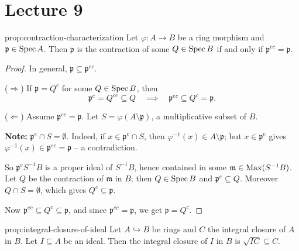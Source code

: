\section{Lecture 9}

\begin{proposition}{}{prop:contraction-characterization}
Let $\varphi: A \to B$ be a ring morphism and $\mathfrak p \in \operatorname{Spec} A$. Then $\mathfrak p$ is the contraction of some $Q \in \operatorname{Spec} B$ if and only if $\mathfrak p^{ec} = \mathfrak p$.
\end{proposition}

\begin{proof}
In general, $\mathfrak p \subseteq \mathfrak p^{ec}$.

($\Rightarrow$) If $\mathfrak p = Q^c$ for some $Q \in \operatorname{Spec} B$, then
\[
\mathfrak p^e = Q^{ce} \subseteq Q \quad\implies\quad \mathfrak p^{ec} \subseteq Q^c = \mathfrak p.
\]

($\Leftarrow$) Assume $\mathfrak p^{ec} = \mathfrak p$. Let $S = \varphi(A \setminus \mathfrak p)$, a multiplicative subset of $B$.

\textbf{Note:} $\mathfrak p^e \cap S = \emptyset$. Indeed, if $x \in \mathfrak p^e \cap S$, then $\varphi^{-1}(x) \in A\setminus\mathfrak p$; but $x \in \mathfrak p^e$ gives $\varphi^{-1}(x) \in \mathfrak p^{ec} = \mathfrak p$ -- a contradiction.

So $\mathfrak p^e S^{-1}B$ is a proper ideal of $S^{-1}B$, hence contained in some $\mathfrak m \in \operatorname{Max}(S^{-1}B)$. Let $Q$ be the contraction of $\mathfrak m$ in $B$; then $Q \in \operatorname{Spec} B$ and $\mathfrak p^e \subseteq Q$. Moreover $Q \cap S = \emptyset$, which gives $Q^c \subseteq \mathfrak p$.

Now $\mathfrak p^{ec} \subseteq Q^c \subseteq \mathfrak p$, and since $\mathfrak p^{ec}=\mathfrak p$, we get $\mathfrak p = Q^c$.
\end{proof}

\begin{proposition}{}{prop:integral-closure-of-ideal}
Let $A \hookrightarrow B$ be rings and $C$ the integral closure of $A$ in $B$. Let $I \subseteq A$ be an ideal. Then the integral closure of $I$ in $B$ is $\sqrt{IC} \subseteq C$.
\end{proposition}

